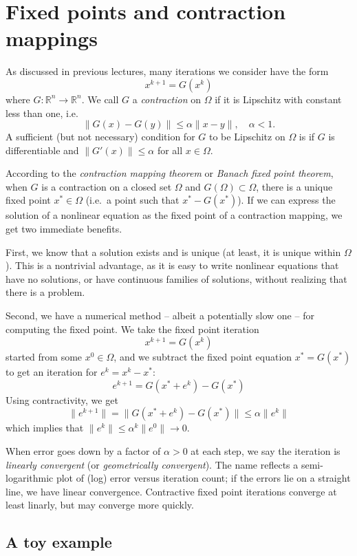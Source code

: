 \documentclass[12pt, leqno]{article} %
\begin{document}

\section{Fixed points and contraction mappings}

As discussed in previous lectures, many iterations we consider have the
form \[x^{k+1} = G(x^k)\] where
\(G : \mathbb{R}^n \rightarrow \mathbb{R}^n\). We call \(G\) a
\emph{contraction} on \(\Omega\) if it is Lipschitz with constant less
than one, i.e. \[\|G(x)-G(y)\| \leq \alpha \|x-y\|, \quad \alpha < 1.\]
A sufficient (but not necessary) condition for \(G\) to be Lipschitz on
\(\Omega\) is if \(G\) is differentiable and \(\|G'(x)\| \leq \alpha\)
for all \(x \in \Omega\).

According to the \emph{contraction mapping theorem} or \emph{Banach
fixed point theorem}, when \(G\) is a contraction on a closed set
\(\Omega\) and \(G(\Omega) \subset \Omega\), there is a unique fixed
point \(x^* \in \Omega\) (i.e.~a point such that \(x^* - G(x^*)\)). If
we can express the solution of a nonlinear equation as the fixed point
of a contraction mapping, we get two immediate benefits.

First, we know that a solution exists and is unique (at least, it is
unique within \(\Omega\)). This is a nontrivial advantage, as it is easy
to write nonlinear equations that have no solutions, or have continuous
families of solutions, without realizing that there is a problem.

Second, we have a numerical method -- albeit a potentially slow one --
for computing the fixed point. We take the fixed point iteration
\[x^{k+1} = G(x^k)\] started from some \(x^0 \in \Omega\), and we
subtract the fixed point equation \(x^* = G(x^*)\) to get an iteration
for \(e^k = x^k-x^*\): \[e^{k+1} = G(x^* + e^k) - G(x^*)\] Using
contractivity, we get
\[\|e^{k+1}\| = \|G(x^* + e^k) - G(x^*)\| \leq \alpha\|e^k\|\] which
implies that \(\|e^k\| \leq \alpha^k \|e^0\| \rightarrow 0.\)

When error goes down by a factor of \(\alpha > 0\) at each step, we say
the iteration is \emph{linearly convergent} (or \emph{geometrically
convergent}). The name reflects a semi-logarithmic plot of (log) error
versus iteration count; if the errors lie on a straight line, we have
linear convergence. Contractive fixed point iterations converge at least
linarly, but may converge more quickly.

\subsection{A toy example}
\end{document}
